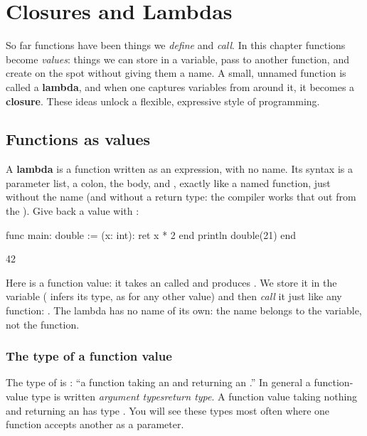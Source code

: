 \chapter{Closures and Lambdas}%
\label{ch:closures-lambdas}

So far functions have been things we \emph{define} and \emph{call}. In this
chapter functions become \emph{values}: things we can store in a variable, pass to
another function, and create on the spot without giving them a name. A small,
unnamed function is called a \textbf{lambda}, and when one captures variables from
around it, it becomes a \textbf{closure}. These ideas unlock a flexible,
expressive style of programming.

\section{Functions as values}

A \textbf{lambda} is a function written as an expression, with no name. Its
syntax is a parameter list, a colon, the body, and , exactly like a
named function, just without the name (and without a return type: the
compiler works that out from the ). Give back a value with :

\begin{salamen}
func main:
    double := (x: int): ret x * 2 end
    println double(21)
end
\end{salamen}

\begin{progout}
42
\end{progout}

Here  is a function value: it takes an
 called  and produces . We store it in the variable 
(\code{:=} infers its type, as for any other value) and then \emph{call} it just like any
function: . The lambda has no name of its own: the name
 belongs to the variable, not the function.

\subsection{The type of a function value}

The type of  is : ``a function taking an
 and returning an .'' In general a function-value type is
written \textit{argument types}\code{) }\textit{return type}. A
function value taking nothing and returning an  has type
. You will see these types most often where one function accepts
another as a parameter.

